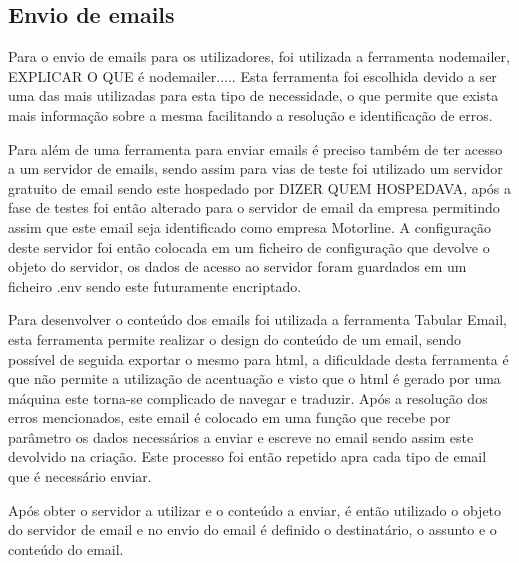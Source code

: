 \subsection{Envio de emails}
Para o envio de emails para os utilizadores, foi utilizada a ferramenta nodemailer, EXPLICAR O QUE é nodemailer..... Esta ferramenta foi escolhida devido a ser uma das mais utilizadas para esta tipo de necessidade, o que permite que exista mais informação sobre a mesma facilitando a resolução e identificação de erros.

Para além de uma ferramenta para enviar emails é preciso também de ter acesso a um servidor de emails, sendo assim para vias de teste foi utilizado um servidor gratuito de email sendo este hospedado por DIZER QUEM HOSPEDAVA, após a fase de testes foi então alterado para o servidor de email da empresa permitindo assim que este email seja identificado como empresa Motorline. A configuração deste servidor foi então colocada em um ficheiro de configuração que devolve o objeto do servidor, os dados de acesso ao servidor foram guardados em um ficheiro .env sendo este futuramente encriptado.

Para desenvolver o conteúdo dos emails foi utilizada a ferramenta Tabular Email, esta ferramenta permite realizar o design do conteúdo de um email, sendo possível de seguida exportar o mesmo para html, a dificuldade desta ferramenta é que não permite a utilização de acentuação e visto que o html é gerado por uma máquina este torna-se complicado de navegar e traduzir. Após a resolução dos erros mencionados, este email é colocado em uma função que recebe por parâmetro os dados necessários a enviar e escreve no email sendo assim este devolvido na criação. Este processo foi então repetido apra cada tipo de email que é necessário enviar.

Após obter o servidor a utilizar e o conteúdo a enviar, é então utilizado o objeto do servidor de email e no envio do email é definido o destinatário, o assunto e o conteúdo do email.

